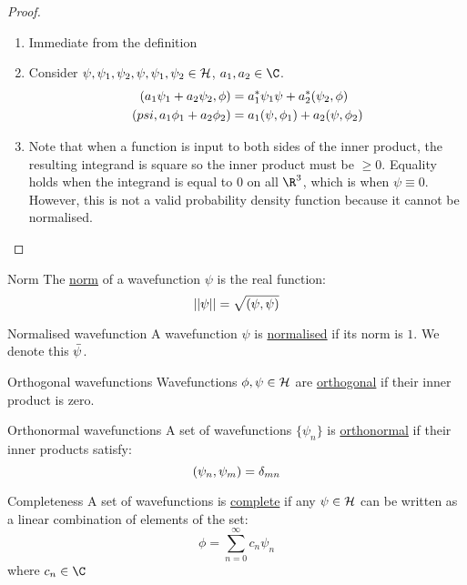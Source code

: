 \documentclass[../Main.tex]{subfiles}
\begin{document}
\begin{proof}
    \begin{enumerate}
        \item Immediate from the definition
        \item Consider $\psi, \psi_1, \psi_2, \psi, \psi_1, \psi_2 \in \mathcal{H}$, $a_1, a_2 \in \C$.
            \begin{align*}
                (a_1 \psi_1 + a_2 \psi_2,\phi) &= a_1^* {\psi_1}{\psi} + a_2^* (\psi_2,\phi) \\
                (psi,a_1 \phi_1 + a_2 \phi_2) &= a_1 (\psi,\phi_1) + a_2 (\psi,\phi_2)
            \end{align*}
        \item Note that when a function is input to both sides of the inner product, the resulting integrand is square so the inner product must be $\geq 0$. Equality holds when the integrand is equal to $0$ on all $\R^3$, which is when $\psi \equiv 0$. However, this is not a valid probability density function because it cannot be normalised.
    \end{enumerate}
\end{proof}
\begin{definition}{Norm}
    The \underline{norm} of a wavefunction $\psi$ is the real function:
    \begin{equation}
        ||\psi|| = \sqrt{(\psi,\psi)}
        \label{eqnWFNorm}
    \end{equation}
\end{definition}
\begin{definition}{Normalised wavefunction}
    A wavefunction $\psi$ is \underline{normalised} if its norm is $1$. We denote this $\bar{\psi}$.
\end{definition}
\begin{definition}{Orthogonal wavefunctions}
    Wavefunctions $\phi, \psi \in \mathcal{H}$ are  \underline{orthogonal} if their inner product is zero.
\end{definition}
\begin{definition}{Orthonormal wavefunctions}
    A set of wavefunctions $\{\psi_n\}$ is  \underline{orthonormal} if their inner products satisfy:
    \begin{equation*}
        (\psi_n,\psi_m) = \delta_{mn}
    \end{equation*}
\end{definition}
\begin{definition}{Completeness}
    A set of wavefunctions is \underline{complete} if any $\psi \in \mathcal{H}$ can be written as a linear combination of elements of the set:
    \begin{equation}
        \phi = \sum_{n = 0}^{\infty} c_n \psi_n
        \label{eqnHilbLinCombo}
    \end{equation}
    where $c_n \in \C$
\end{definition}
\end{document}
